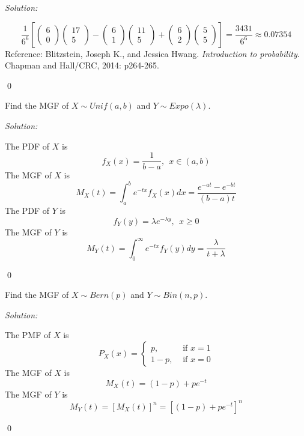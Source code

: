 \documentclass[12pt]{article}
\newenvironment{problem}[2][Problem]{\begin{trivlist}
\item[\hskip \labelsep {\bfseries #1}\hskip \labelsep {\bfseries #2.}]}{\end{trivlist}}
\newenvironment{sol}
    {\emph{Solution:}
    }
    {
    \qed
    }
\begin{document}
\begin{sol}
\[\frac{1}{6^6}\left[\left(\begin{array}{c}6\\0\end{array}\right)\left(\begin{array}{c}17\\5\end{array}\right)-\left(\begin{array}{c}6\\1\end{array}\right)\left(\begin{array}{c}11\\5\end{array}\right)+\left(\begin{array}{c}6\\2\end{array}\right)\left(\begin{array}{c}5\\5\end{array}\right)\right]=\frac{3431}{6^6}\approx0.07354
\]
Reference: Blitzstein, Joseph K., and Jessica Hwang. \textit{Introduction to probability}. Chapman and Hall/CRC, 2014: p264-265.
\end{sol}

\begin{problem}{2} 
Find the MGF of $X\sim Unif(a,b)$ and $Y\sim Expo(\lambda)$.
\end{problem}
\begin{sol}
The PDF of $X$ is
\[
f_X(x)=\frac{1}{b-a},~~x\in(a,b)
\]
The MGF of $X$ is
\[
M_X(t)=\int_{a}^{b}e^{-tx}f_X(x)dx=\frac{e^{-at}-e^{-bt}}{(b-a)t}
\]
The PDF of $Y$ is
\[
f_Y(y)=\lambda e^{-\lambda y},~~x\geq0
\]
The MGF of $Y$ is
\[
M_Y(t)=\int_{0}^{\infty}e^{-tx}f_Y(y)dy=\frac{\lambda}{t+\lambda}
\]
\end{sol}



\begin{problem}{3}
Find the MGF of $X\sim Bern(p)$ and $Y\sim Bin(n,p)$.
\end{problem}
\begin{sol}
The PMF of $X$ is
\[
P_X(x)=\left\{\begin{array}{ll}
p,&\text{ if }x=1\\
1-p,&\text{ if }x=0
\end{array}\right.
\]
The MGF of $X$ is
\[
M_X(t)=(1-p)+pe^{-t}
\]
The MGF of $Y$ is
\[
M_Y(t)=[M_X(t)]^n=[(1-p)+pe^{-t}]^n
\]
\end{sol}
\end{document}
